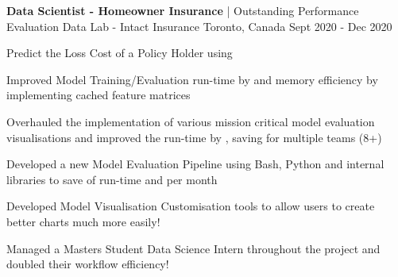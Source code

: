 
\begin{cventries}
  \cventry
    {\textbf{Data Scientist - Homeowner Insurance} | Outstanding Performance Evaluation} %
    {Data Lab - Intact Insurance} %
    {Toronto, Canada} %
    {Sept 2020 - Dec 2020} %
    {
      \begin{cvitems} %
        \item { Predict the Loss Cost of a Policy Holder using }
        \item {Improved Model Training/Evaluation run-time by  and memory efficiency by implementing cached feature matrices}
        \item {Overhauled the implementation of various mission critical model evaluation visualisations and improved the run-time by , saving  for multiple teams (8+)}
        \item {Developed a new Model Evaluation Pipeline using Bash, Python and internal libraries to save  of run-time and  per month}
        \item {Developed Model Visualisation Customisation tools to allow users to create better charts much more easily!}
        \item {Managed a Masters Student Data Science Intern throughout the project and doubled their workflow efficiency!}
      \end{cvitems}
    }


\end{cventries}
